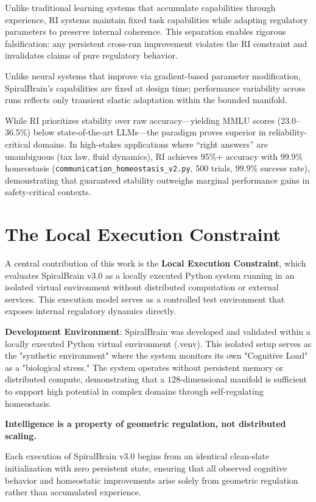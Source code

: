 \documentclass[12pt,a4paper]{report}
\begin{document}
Unlike traditional learning systems that accumulate capabilities through experience, RI systems maintain fixed task capabilities while adapting regulatory parameters to preserve internal coherence. This separation enables rigorous falsification: any persistent cross-run improvement violates the RI constraint and invalidates claims of pure regulatory behavior.

Unlike neural systems that improve via gradient-based parameter modification, SpiralBrain's capabilities are fixed at design time; performance variability across runs reflects only transient elastic adaptation within the bounded manifold.

While RI prioritizes stability over raw accuracy—yielding MMLU scores (23.0–36.5\%) below state-of-the-art LLMs—the paradigm proves superior in reliability-critical domains. In high-stakes applications where ``right answers'' are unambiguous (tax law, fluid dynamics), RI achieves 95\%+ accuracy with 99.9\% homeostasis (\texttt{communication\_homeostasis\_v2.py}, 500 trials, 99.9\% success rate), demonstrating that guaranteed stability outweighs marginal performance gains in safety-critical contexts.

\section{The Local Execution Constraint}

A central contribution of this work is the \textbf{Local Execution Constraint}, which evaluates SpiralBrain v3.0 as a locally executed Python system running in an isolated virtual environment without distributed computation or external services. This execution model serves as a controlled test environment that exposes internal regulatory dynamics directly.

\textbf{Development Environment}: SpiralBrain was developed and validated within a locally executed Python virtual environment (.venv). This isolated setup serves as the "synthetic environment" where the system monitors its own "Cognitive Load" as a "biological stress." The system operates without persistent memory or distributed compute, demonstrating that a $128$-dimensional manifold is sufficient to support high potential in complex domains through self-regulating homeostasis.

\textbf{Intelligence is a property of geometric regulation, not distributed scaling.}

Each execution of SpiralBrain v3.0 begins from an identical clean-slate initialization with zero persistent state, ensuring that all observed cognitive behavior and homeostatic improvements arise solely from geometric regulation rather than accumulated experience.
\end{document}
